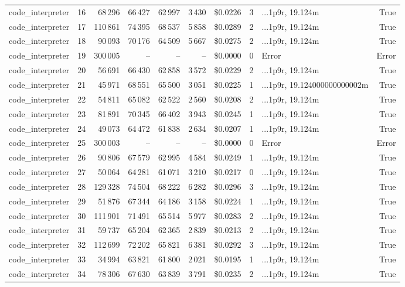 \documentclass[a4paper,11pt]{article}
\begin{document}
\begin{table}[H]
{\begin{tabular}{l r r r r r r r l r}
code\_interpreter & 16 & 68\,296 & 66\,427 & 62\,997 & 3\,430 & \$0.0226 & 3 & ...1p9r, 19.124m & True \\
code\_interpreter & 17 & 110\,861 & 74\,395 & 68\,537 & 5\,858 & \$0.0289 & 2 & ...1p9r, 19.124m & True \\
code\_interpreter & 18 & 90\,093 & 70\,176 & 64\,509 & 5\,667 & \$0.0275 & 2 & ...1p9r, 19.124m & True \\
code\_interpreter & 19 & 300\,005 & -- & -- & -- & \$0.0000 & 0 & Error & Error \\
code\_interpreter & 20 & 56\,691 & 66\,430 & 62\,858 & 3\,572 & \$0.0229 & 2 & ...1p9r, 19.124m & True \\
code\_interpreter & 21 & 45\,971 & 68\,551 & 65\,500 & 3\,051 & \$0.0225 & 1 & ...1p9r, 19.124000000000002m & True \\
code\_interpreter & 22 & 54\,811 & 65\,082 & 62\,522 & 2\,560 & \$0.0208 & 2 & ...1p9r, 19.124m & True \\
code\_interpreter & 23 & 81\,891 & 70\,345 & 66\,402 & 3\,943 & \$0.0245 & 1 & ...1p9r, 19.124m & True \\
code\_interpreter & 24 & 49\,073 & 64\,472 & 61\,838 & 2\,634 & \$0.0207 & 1 & ...1p9r, 19.124m & True \\
code\_interpreter & 25 & 300\,003 & -- & -- & -- & \$0.0000 & 0 & Error & Error \\
code\_interpreter & 26 & 90\,806 & 67\,579 & 62\,995 & 4\,584 & \$0.0249 & 1 & ...1p9r, 19.124m & True \\
code\_interpreter & 27 & 50\,064 & 64\,281 & 61\,071 & 3\,210 & \$0.0217 & 0 & ...1p9r, 19.124m & True \\
code\_interpreter & 28 & 129\,328 & 74\,504 & 68\,222 & 6\,282 & \$0.0296 & 3 & ...1p9r, 19.124m & True \\
code\_interpreter & 29 & 51\,876 & 67\,344 & 64\,186 & 3\,158 & \$0.0224 & 1 & ...1p9r, 19.124m & True \\
code\_interpreter & 30 & 111\,901 & 71\,491 & 65\,514 & 5\,977 & \$0.0283 & 2 & ...1p9r, 19.124m & True \\
code\_interpreter & 31 & 59\,737 & 65\,204 & 62\,365 & 2\,839 & \$0.0213 & 2 & ...1p9r, 19.124m & True \\
code\_interpreter & 32 & 112\,699 & 72\,202 & 65\,821 & 6\,381 & \$0.0292 & 3 & ...1p9r, 19.124m & True \\
code\_interpreter & 33 & 34\,994 & 63\,821 & 61\,800 & 2\,021 & \$0.0195 & 1 & ...1p9r, 19.124m & True \\
code\_interpreter & 34 & 78\,306 & 67\,630 & 63\,839 & 3\,791 & \$0.0235 & 2 & ...1p9r, 19.124m & True \\

\end{tabular}}
\end{table}
\end{document}
